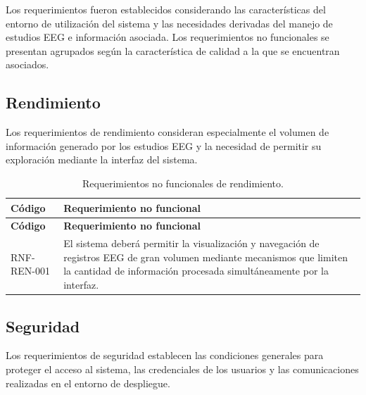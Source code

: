 Los requerimientos fueron establecidos considerando las características del
entorno de utilización del sistema y las necesidades derivadas del manejo de
estudios EEG e información asociada. Los requerimientos no funcionales se presentan
agrupados según la característica de calidad a la que se encuentran asociados.

\subsection{Rendimiento}
\label{subsec:rnf-rendimiento}

Los requerimientos de rendimiento consideran especialmente el volumen de
información generado por los estudios EEG y la necesidad de permitir su
exploración mediante la interfaz del sistema.

\begin{longtable}{|p{}|p{}|}
    \caption{Requerimientos no funcionales de rendimiento.}
    \label{tab:rnf-rendimiento}\\
    \hline
    \textbf{Código} & \textbf{Requerimiento no funcional} \\
    \hline
    \endfirsthead

    \hline
    \textbf{Código} & \textbf{Requerimiento no funcional} \\
    \hline
    \endhead

    RNF-REN-001 &
    El sistema deberá permitir la visualización y navegación de registros EEG
    de gran volumen mediante mecanismos que limiten la cantidad de información
    procesada simultáneamente por la interfaz. \\
    \hline
\end{longtable}


\subsection{Seguridad}
\label{subsec:rnf-seguridad}

Los requerimientos de seguridad establecen las condiciones generales para
proteger el acceso al sistema, las credenciales de los usuarios y las
comunicaciones realizadas en el entorno de despliegue.

